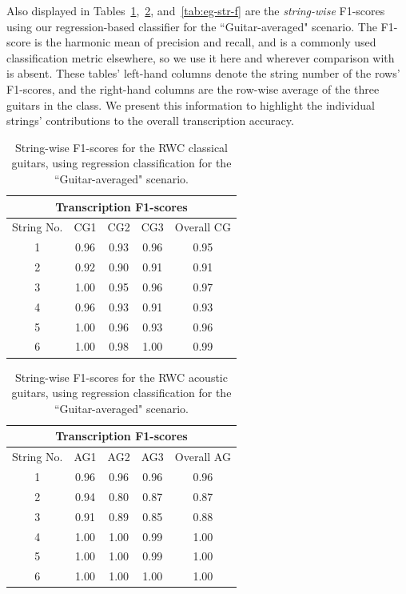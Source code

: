\documentclass[12pt]{cmuthesis}
\begin{document}
Also displayed in Tables~\ref{tab:cg-str-f},~\ref{tab:ag-str-f}, and~\ref{tab:eg-str-f} are the \textit{string-wise} F1-scores using our regression-based classifier for the ``Guitar-averaged" scenario. The F1-score is the harmonic mean of precision and recall, and is a commonly used classification metric elsewhere, so we use it here and wherever comparison with~\cite{barbanchoi2012} is absent. These tables' left-hand columns denote the string number of the rows' F1-scores, and the right-hand columns are the row-wise average of the three guitars in the class. We present this information to highlight the individual strings' contributions to the overall transcription accuracy.

\begin{table}[!htbp]
\begin{center}
\begin{tabular}{||c|c|c|c|c||}
\hline
\multicolumn{5}{||c||}{\bf{Transcription F1-scores}} \\
\hline
String No. & CG1 & CG2 & CG3 & Overall CG \\
\hline
1 & 0.96 & 0.93 & 0.96 & 0.95\\
\hline
2 & 0.92 & 0.90 & 0.91 & 0.91\\
\hline
3 & 1.00 & 0.95 & 0.96 & 0.97\\
\hline
4 & 0.96 & 0.93 & 0.91 & 0.93\\
\hline
5 & 1.00 & 0.96 & 0.93 & 0.96 \\
\hline
6 & 1.00 & 0.98 & 1.00 & 0.99\\ 
\hline
\hline
\end{tabular}
\caption{String-wise F1-scores for the RWC classical guitars, using regression classification for the ``Guitar-averaged" scenario.} 
\label{tab:cg-str-f}
\end{center}
\end{table}

\begin{table}[!htbp]
\begin{center}
\begin{tabular}{||c||c|c|c|c||}
\hline
\multicolumn{5}{||c||}{\bf{Transcription F1-scores}} \\
\hline
String No. & AG1 & AG2 & AG3 & Overall AG \\
\hline
1 &  0.96 & 0.96 & 0.96 & 0.96 \\
\hline
2 & 0.94 & 0.80 & 0.87 &  0.87\\
\hline
3 & 0.91 & 0.89 & 0.85 & 0.88\\
\hline
4 & 1.00 & 1.00 & 0.99 &  1.00 \\
\hline
5 & 1.00 & 1.00 & 0.99 &  1.00 \\
\hline
6 & 1.00 & 1.00 & 1.00 & 1.00 \\ 
\hline
\hline
\end{tabular}
\caption{String-wise F1-scores for the RWC acoustic guitars, using regression classification for the ``Guitar-averaged" scenario.} 
\label{tab:ag-str-f}
\end{center}
\end{table}
\end{document}
